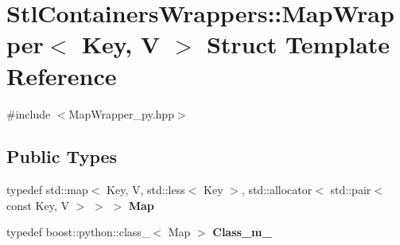 \hypertarget{struct_stl_containers_wrappers_1_1_map_wrapper}{
\section{StlContainersWrappers::MapWrapper$<$ Key, V $>$ Struct Template Reference}
\label{struct_stl_containers_wrappers_1_1_map_wrapper}
}


{\ttfamily \#include $<$MapWrapper\_\-py.hpp$>$}

\subsection*{Public Types}
\begin{DoxyCompactItemize}
\item 
\hypertarget{struct_stl_containers_wrappers_1_1_map_wrapper_aa04f050f2ac6496a17df0c7fd2a331cf}{
typedef std::map$<$ Key, V, std::less$<$ Key $>$, std::allocator$<$ std::pair$<$ const Key, V $>$ $>$ $>$ {\bfseries Map}}
\label{struct_stl_containers_wrappers_1_1_map_wrapper_aa04f050f2ac6496a17df0c7fd2a331cf}

\item 
\hypertarget{struct_stl_containers_wrappers_1_1_map_wrapper_a8f0cd3721bde9cc31001956afc1b440a}{
typedef boost::python::class\_\-$<$ Map $>$ {\bfseries Class\_\-m\_\-}}
\label{struct_stl_containers_wrappers_1_1_map_wrapper_a8f0cd3721bde9cc31001956afc1b440a}

\end{DoxyCompactItemize}
